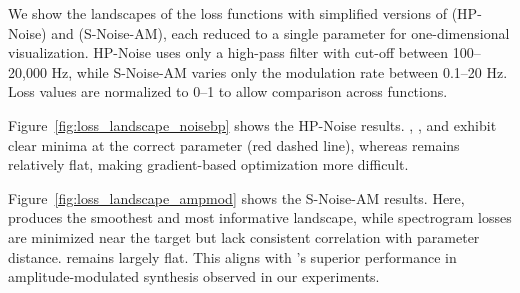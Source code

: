 We show the landscapes of the loss functions with simplified versions of \BPNoise{} (HP-Noise) and \AmpMod{} (S-Noise-AM), each reduced to a single parameter for one-dimensional visualization. HP-Noise uses only a high-pass filter with cut-off between 100–20,000 Hz, while S-Noise-AM varies only the modulation rate between 0.1–20 Hz. Loss values are normalized to 0–1 to allow comparison across functions.

Figure~\ref{fig:loss_landscape_noisebp} shows the HP-Noise results. \LoneSpec{}, \SIMSESpec{}, and \JTFS{} exhibit clear minima at the correct parameter (red dashed line), whereas \DTWEnv{} remains relatively flat, making gradient-based optimization more difficult.

Figure~\ref{fig:loss_landscape_ampmod} shows the S-Noise-AM results. Here, \DTWEnv{} produces the smoothest and most informative landscape, while spectrogram losses are minimized near the target but lack consistent correlation with parameter distance. \JTFS{} remains largely flat. This aligns with \DTWEnv's superior performance in amplitude-modulated synthesis observed in our experiments.

